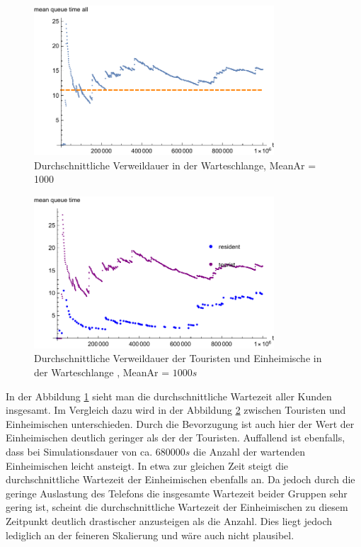 \begin{figure}[htpb]
	\centering
	\includegraphics[width=0.8\textwidth]{abbildungen/1_Phone_VIP/Arrival_1000_Serve_100_dur_1000000_Skip_0/MeanQueueTimeAll.pdf}
	\caption{Durchschnittliche Verweildauer in der Warteschlange, MeanAr = 1000}
	\label{fig:MQTVIP1000ALL}
\end{figure}

\begin{figure}[htpb]
	\centering
	\includegraphics[width=0.8\textwidth]{abbildungen/1_Phone_VIP/Arrival_1000_Serve_100_dur_1000000_Skip_0/MeanQueueTimeTouristAndResident.pdf}
	\caption{Durchschnittliche Verweildauer der Touristen und Einheimische in der Warteschlange , MeanAr = $1000s$}
	\label{fig:MQTVIP1000VGL}
\end{figure}

In der Abbildung \ref{fig:MQTVIP1000ALL} sieht man die durchschnittliche Wartezeit aller Kunden insgesamt. Im Vergleich dazu wird in der Abbildung \ref{fig:MQTVIP1000VGL} zwischen Touristen und Einheimischen unterschieden. Durch die Bevorzugung ist auch hier der Wert der Einheimischen deutlich geringer als der der Touristen. Auffallend ist ebenfalls, dass bei Simulationsdauer von ca. $680000s$ die Anzahl der wartenden Einheimischen leicht ansteigt. In etwa zur gleichen Zeit steigt die durchschnittliche Wartezeit der Einheimischen ebenfalls an. Da jedoch durch die geringe Auslastung des Telefons die insgesamte Wartezeit beider Gruppen sehr gering ist, scheint die durchschnittliche Wartezeit der Einheimischen zu diesem Zeitpunkt deutlich drastischer anzusteigen als die Anzahl. Dies liegt jedoch lediglich an der feineren Skalierung und wäre auch nicht plausibel.

